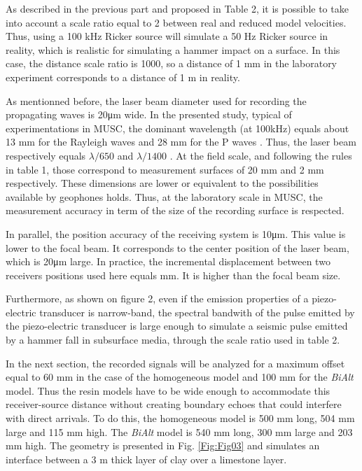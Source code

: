 \documentclass[extra,mreferee]{gji}
\newcommand{\bialt}{\textit{BiAlt} }
\begin{document}
As described in the previous part and proposed in Table 2, it is possible to take into account a scale ratio equal to 2 between real and reduced model velocities. Thus, using a 100 kHz Ricker source will simulate a 50 Hz Ricker source in reality, which is realistic for simulating a hammer impact on a surface. In this case, the distance scale ratio is 1000, so a distance of 1 mm in the laboratory experiment corresponds to a distance of 1 m in reality. 

{\color{magenta} As mentionned before, the laser beam diameter used for recording the propagating waves is 20μm wide. In the presented study, typical of experimentations in MUSC, the dominant wavelength (at 100kHz) equals about 13 mm for the Rayleigh waves and 28 mm for the P waves . Thus, the laser beam respectively equals  $\lambda /650 $ and $ \lambda /1400 $  . At the field scale, and following the rules in table 1, those correspond to measurement surfaces of 20 mm and 2 mm respectively. These dimensions are lower or equivalent to the possibilities available by geophones holds. Thus, at the laboratory scale in MUSC, the measurement accuracy in term of the size of the recording surface is respected.

In parallel, the position accuracy of the receiving system is 10μm. This value is lower to the focal beam. It corresponds to the center position of the laser beam, which is 20μm large. In practice, the incremental displacement between two receivers positions used here equals mm. It is higher than the focal beam size.

Furthermore, as shown on figure 2, even if the emission properties of a piezo-electric transducer is narrow-band, the spectral bandwith of the pulse emitted by the piezo-electric transducer is large enough to simulate a seismic pulse emitted by a hammer fall in subsurface media, through the scale ratio used in table 2.}

In the next section, the recorded signals will be analyzed for a maximum offset equal to 60 mm in the case of the homogeneous model and 100 mm for the \bialt model. Thus the resin models have to be wide enough to accommodate this receiver-source distance without creating boundary echoes that could interfere with direct arrivals. To do this, the homogeneous model is 500 mm long, 504 mm large and 115 mm high. The \bialt model is 540 mm long, 300 mm large and 203 mm high. The geometry is presented in Fig. \ref{Fig:Fig03} and simulates an interface between a 3 m thick layer of clay over a limestone layer.
\end{document}
